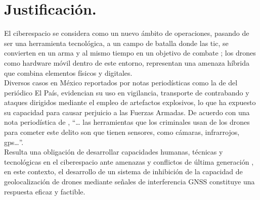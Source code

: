 \chapter*{Justificación.}

\begin{justify}
    El ciberespacio se considera como un nuevo ámbito de operaciones, pasando de ser una herramienta tecnológica,
    a un campo de batalla donde las \gls{tic}, se convierten en un arma y
    al mismo tiempo en un objetivo de combate \parencite{defensa2022manual}; los drones como hardware móvil dentro de este entorno,
    representan una amenaza híbrida que combina elementos físicos y digitales.\\

    \noindent Diversos casos en México reportados por notas periodísticas como la de \textcite{santos2022drones} del periódico El País,
    evidencian su uso en vigilancia, transporte de contrabando y ataques dirigidos mediante
    el empleo de artefactos explosivos, lo que ha expuesto su capacidad para causar perjuicio a las Fuerzas Armadas.
    De acuerdo con una nota periodística de \textcite{radioformula2024drones}, “… las herramientas que los criminales usan de los drones
    para cometer este delito son que tienen sensores, como cámaras, infrarrojos, \gls{gps}…”.\\

    \noindent Resulta una obligación de desarrollar capacidades humanas, técnicas y tecnológicas en el
    ciberespacio ante amenazas y conflictos de última generación \parencite{defensa2022manual}, en este contexto,
    el desarrollo de un sistema de inhibición de la capacidad de geolocalización de drones mediante señales de
    interferencia GNSS constituye una respuesta eficaz y factible.
\end{justify}